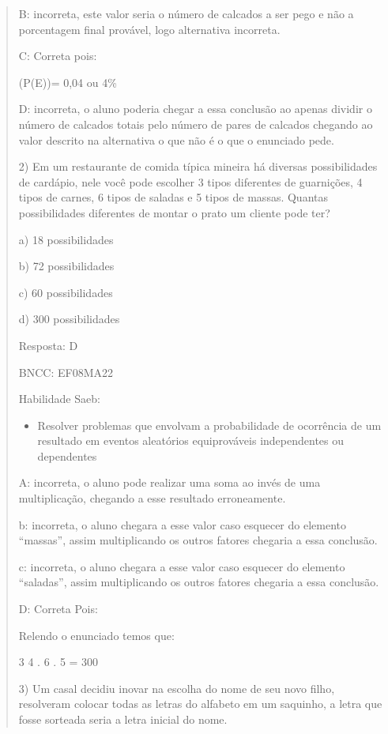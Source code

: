 \begin{quote}
\begin{escolha}
B: incorreta, este valor seria o número de calcados a ser pego e não a
porcentagem final provável, logo alternativa incorreta.

C: Correta pois:

(P(E))= 0,04 ou 4\%

D: incorreta, o aluno poderia chegar a essa conclusão ao apenas dividir
o número de calcados totais pelo número de pares de calcados chegando ao
valor descrito na alternativa o que não é o que o enunciado pede.

2) Em um restaurante de comida típica mineira há diversas possibilidades
de cardápio, nele você pode escolher 3 tipos diferentes de guarnições, 4
tipos de carnes, 6 tipos de saladas e 5 tipos de massas. Quantas
possibilidades diferentes de montar o prato um cliente pode ter?

a) 18 possibilidades

b) 72 possibilidades

c) 60 possibilidades

d) 300 possibilidades

Resposta: D

BNCC: EF08MA22

Habilidade Saeb:

\begin{itemize}
\tightlist
\item
  Resolver problemas que envolvam a probabilidade de ocorrência de um
  resultado em eventos aleatórios equiprováveis independentes ou
  dependentes
\end{itemize}

A: incorreta, o aluno pode realizar uma soma ao invés de uma
multiplicação, chegando a esse resultado erroneamente.

b: incorreta, o aluno chegara a esse valor caso esquecer do elemento
``massas'', assim multiplicando os outros fatores chegaria a essa
conclusão.

c: incorreta, o aluno chegara a esse valor caso esquecer do elemento
``saladas'', assim multiplicando os outros fatores chegaria a essa
conclusão.

D: Correta Pois:

Relendo o enunciado temos que:

\num{3} 4 . 6 . 5 = 300

3) Um casal decidiu inovar na escolha do nome de seu novo filho,
resolveram colocar todas as letras do alfabeto em um saquinho, a letra
que fosse sorteada seria a letra inicial do nome.


\end{escolha}
\end{quote}
